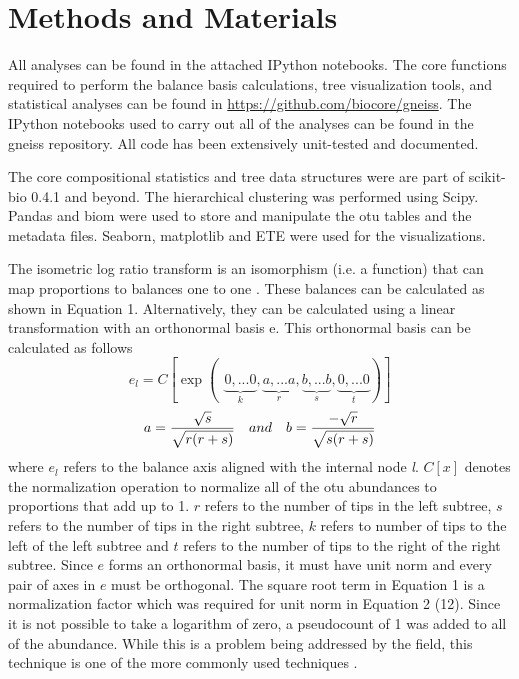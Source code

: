  \section{Methods and Materials}
 All analyses can be found in the attached IPython notebooks.  The core functions required to perform the balance basis calculations, tree visualization tools, and statistical analyses can be found in \url{https://github.com/biocore/gneiss}.  The IPython notebooks used to carry out all of the analyses can be found in the gneiss repository.  All code has been extensively unit-tested and documented. \par
 The core compositional statistics and tree data structures were are part of scikit-bio 0.4.1 and beyond. The hierarchical clustering was performed using Scipy.  Pandas and \gls{biom} \cite{biom} were used to store and manipulate the \gls{otu} tables and the metadata files.  Seaborn, matplotlib and ETE \cite{ete} were used for the visualizations.\par
 The isometric log ratio transform is an isomorphism (i.e. a function) that can map proportions to balances one to one \cite{ilr}.  These balances can be calculated as shown in Equation 1. Alternatively, they can be calculated using a linear transformation with an orthonormal basis e. This orthonormal basis can be calculated as follows
 \begin{equation}
        e_{l}=C\left [\exp(\: \: \underset{k}{\underbrace{0,...0}},\underset{r}{\underbrace{a,...a}},\underset{s}{\underbrace{b,...b}}, \underset{t}{\underbrace{0,...0}}) \right]
 \end{equation}
 \begin{equation}
        a=\frac{\sqrt{s}}{\sqrt{r(r+s)}} \quad  and \quad b=\frac{-\sqrt{r}}{\sqrt{s(r+s)}}\notag
 \end{equation}
 where $e_{l}$ refers to the balance axis aligned with the internal node \textit{l}. $C[x]$ denotes the normalization operation to normalize all of the \gls{otu} abundances to proportions that add up to 1.  $r$ refers to the number of tips in the left subtree, $s$ refers to the number of tips in the right subtree, $k$ refers to number of tips to the left of the left subtree and $t$ refers to the number of tips to the right of the right subtree. Since $e$ forms an orthonormal basis, it must have unit norm and every pair of axes in $e$ must be orthogonal.  The square root term   in Equation 1 is a normalization factor which was required for unit norm in Equation 2 (12).    Since it is not possible to take a logarithm of zero, a pseudocount of 1 was added to all of the abundance.  While this is a problem being addressed by the field, this technique is one of the more commonly used techniques \cite{dealing_with_zeros}.\par
